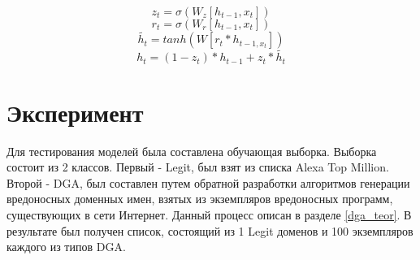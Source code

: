     \begin{equation}\label{gr:1}
    z_{t}=\sigma(W_{z}[h_{t-1},x_{t}])
    \end{equation}
    \begin{equation}\label{gr:2}
    r_{t}=\sigma(W_{r}[h_{t-1},x_{t}])
    \end{equation}
    \begin{equation}\label{gr:3}
    \tilde{h_{t}}=tanh(W[r_{t}*h_{t-1,x_{t}}])
    \end{equation}
    \begin{equation}\label{gr:4}
    h_{t}=(1-z_{t})*h_{t-1}+z_{t}*\tilde{h_{t}}
    \end{equation}
\clearpage

\section{Эксперимент}\label{experiment}
    Для тестирования моделей была составлена обучающая выборка. Выборка состоит из 2 классов. Первый - Legit, был взят из списка Alexa Top Million. Второй - DGA, был составлен путем обратной разработки алгоритмов генерации вредоносных доменных имен, взятых из экземпляров вредоносных программ, существующих в сети Интернет. Данный процесс описан в разделе \ref{dga_teor}. В результате был получен список, состоящий из 1 Legit доменов и 100 экземпляров каждого из типов DGA.
